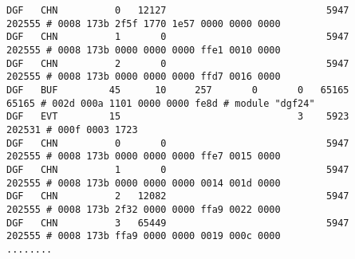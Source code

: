 \documentclass[12pt]{article}
\begin{document}
\begin{scriptsize}
\verb+DGF   CHN          0   12127                            5947          202555 # 0008 173b 2f5f 1770 1e57 0000 0000 0000+\\
\verb+DGF   CHN          1       0                            5947          202555 # 0008 173b 0000 0000 0000 ffe1 0010 0000+\\
\verb+DGF   CHN          2       0                            5947          202555 # 0008 173b 0000 0000 0000 ffd7 0016 0000+\\
\verb+DGF   BUF         45      10     257       0       0   65165           65165 # 002d 000a 1101 0000 0000 fe8d # module "dgf24"+\\
\verb+DGF   EVT         15                               3    5923          202531 # 000f 0003 1723+\\
\verb+DGF   CHN          0       0                            5947          202555 # 0008 173b 0000 0000 0000 ffe7 0015 0000+\\
\verb+DGF   CHN          1       0                            5947          202555 # 0008 173b 0000 0000 0000 0014 001d 0000+\\
\verb+DGF   CHN          2   12082                            5947          202555 # 0008 173b 2f32 0000 0000 ffa9 0022 0000+\\
\verb+DGF   CHN          3   65449                            5947          202555 # 0008 173b ffa9 0000 0000 0019 000c 0000+\\
\verb+........+\\
\end{scriptsize}
\end{document}
